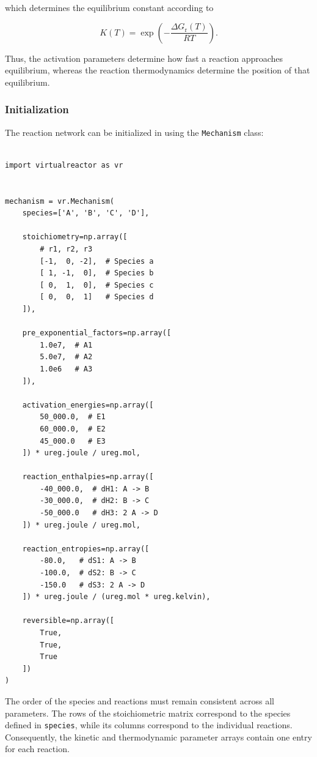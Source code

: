 which determines the equilibrium constant according to

\begin{equation}
    K(T)
    =
    \exp\left(
        -\frac{\Delta G_{\mathrm{r}}(T)}{RT}
    \right).
\end{equation}

Thus, the activation parameters determine how fast a reaction approaches
equilibrium, whereas the reaction thermodynamics determine the position of
that equilibrium.


\subsubsection{Initialization}

The reaction network can be initialized in \VirtualReactor{} using the
\texttt{Mechanism} class:

\begin{verbatim}

import virtualreactor as vr


mechanism = vr.Mechanism(
    species=['A', 'B', 'C', 'D'],

    stoichiometry=np.array([
        # r1, r2, r3
        [-1,  0, -2],  # Species a
        [ 1, -1,  0],  # Species b
        [ 0,  1,  0],  # Species c
        [ 0,  0,  1]   # Species d
    ]),

    pre_exponential_factors=np.array([
        1.0e7,  # A1
        5.0e7,  # A2
        1.0e6   # A3
    ]),

    activation_energies=np.array([
        50_000.0,  # E1
        60_000.0,  # E2
        45_000.0   # E3
    ]) * ureg.joule / ureg.mol,

    reaction_enthalpies=np.array([
        -40_000.0,  # dH1: A -> B
        -30_000.0,  # dH2: B -> C
        -50_000.0   # dH3: 2 A -> D
    ]) * ureg.joule / ureg.mol,

    reaction_entropies=np.array([
        -80.0,   # dS1: A -> B
        -100.0,  # dS2: B -> C
        -150.0   # dS3: 2 A -> D
    ]) * ureg.joule / (ureg.mol * ureg.kelvin),

    reversible=np.array([
        True,
        True,
        True
    ])
)
\end{verbatim}

The order of the species and reactions must remain consistent across all
parameters. The rows of the stoichiometric matrix correspond to the species
defined in \texttt{species}, while its columns correspond to the individual
reactions. Consequently, the kinetic and thermodynamic parameter arrays
contain one entry for each reaction.

